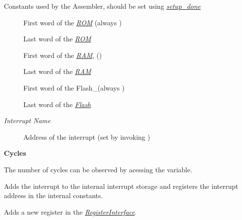 \documentclass[letterpaper,10pt,english]{sphinxmanual}
\begin{document}
\begin{fulllineitems}
Constants used by the Assembler, should be set using {\hyperref[core:setup\string-done]{\emph{setup\_done}}}
\begin{description}
\item[{}] \leavevmode
First word of the {\hyperref[core:rom]{\emph{ROM}}} (always )

\item[{ }] \leavevmode
Last word of the {\hyperref[core:rom]{\emph{ROM}}}

\item[{}] \leavevmode
First word of the {\hyperref[core:ram]{\emph{RAM}}}, ()

\item[{}] \leavevmode
Last word of the {\hyperref[core:ram]{\emph{RAM}}}

\item[{}] \leavevmode
First word of the Flash\_(always )

\item[{}] \leavevmode
Last word of the {\hyperref[core:flash]{\emph{Flash}}}

\item[{\emph{Interrupt Name}}] \leavevmode
Address of the interrupt (set by invoking )

\end{description}

\textbf{Cycles}

The number of cycles can be observed by acessing the  variable.

\begin{fulllineitems}
\label{core:py_register_machine2.core.processor.Processor.add_interrupt}
Adds the interrupt to the internal interrupt storage  and
registers the interrupt address in the internal constants.

\end{fulllineitems}


\begin{fulllineitems}
\label{core:py_register_machine2.core.processor.Processor.add_register}
Adds a new register in the {\hyperref[core:registerinterface]{\emph{RegisterInterface}}}.


\end{fulllineitems}
\end{fulllineitems}
\end{document}
